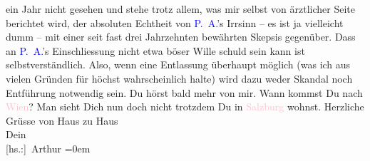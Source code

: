                ein Jahr nicht gesehen und stehe trotz allem, was mir selbst von ärztlicher Seite
               berichtet wird, der absoluten Echtheit von \textcolor{blue}{P. A.}{}\ledrightnote{\textcolor{blue}{Peter Altenberg}}’s
                  Irr{\pb}sinn – es ist ja
               vielleicht dumm – mit einer seit fast drei Jahrzehnten bewährten Skepsis gegenüber.
               Dass an \textcolor{blue}{P. A.}{}\ledrightnote{\textcolor{blue}{Peter Altenberg}}’s Einschliessung nicht etwa böser
               Wille schuld sein kann ist selbstverständlich. Also, wenn eine Entlassung überhaupt
               möglich (was ich aus vielen Gründen für höchst wahrscheinlich halte) wird dazu weder
               Skandal noch Entführung notwendig sein. Du hörst bald mehr von mir. Wann kommst Du
               nach \textcolor{pink}{Wien}{}\ledrightnote{\textcolor{pink}{Wien}}? Man sieht Dich nun doch nicht trotzdem Du
               in \textcolor{pink}{Salzburg}{}\ledrightnote{\textcolor{pink}{Salzburg}} wohnst.\pend
           \pstart
           Herzliche Grüsse von Haus zu Haus{\\[\baselineskip]}Dein{\\[\baselineskip]}\spacefill\mbox{{[}hs.:{]} Arthur}\pend
           \leftskip=0em{}\endnumbering{}  
      